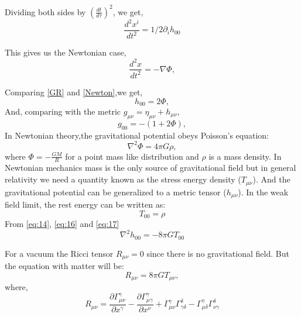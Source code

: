\documentclass{ttuthes2007}
\begin{document}
Dividing both sides by $\left(\frac{dt}{d\tau}\right)^2$, we get,
\begin{equation} \label{GR}                                                               
\frac{d^2x^i}{dt^2}=1/2 \partial _i h_{00}
\end{equation} 

This gives us the Newtonian case,
\begin{equation} \label{Newton}
\frac{d^2x}{dt^2}=-\nabla \Phi,
\end{equation}

Comparing \ref{GR} and \ref{Newton},we get,
\begin{equation} \label{eq:14}
h_{00}=2\Phi,
\end{equation}
And, comparing with the metric $g_{\mu \nu}= \eta_{\mu \nu} + h_{\mu \nu}$,
\begin{equation}\label{eq:15}
g_{00}=-(1+2\Phi),
\end{equation}
In Newtonian theory,the  gravitational potential obeys Poisson's
equation:
\begin{equation} \label{eq:16}
\nabla ^ 2\Phi = 4\pi G\rho,
\end{equation}
where $\Phi=-\frac{GM}{R}$ for a point mass like distribution and $\rho$ is a
mass density. In Newtonian mechanics mass is the only source of gravitational
field but in general relativity we need a quantity known as the stress energy
density ($T_{\mu\nu}$). And the gravitational potential can be generalized to a metric
tensor ($h_{\mu\nu}$).
In the weak field limit, the rest energy can be written as:
\begin{equation}\label{eq:17}
T_{00}=\rho
\end{equation}
From \ref{eq:14}, \ref{eq:16} and \ref{eq:17}
\begin{equation} \label{eq:18}
\nabla ^2h_{00}=-8\pi GT_{00}
\end{equation}
	
	For a vacuum the Ricci tensor $R_{\mu \nu} = 0$ since
there is no gravitational field. But the equation with matter will be:
\begin{equation} \label{eq:19}
R_{\mu \nu} = 8 \pi GT_{\mu \nu},
\end{equation}
where,
\begin{equation} \label{eq:22}
R_{\mu \nu} = \frac{\partial \Gamma ^\gamma _{\mu \nu}}{\partial x^\gamma} -
\frac{\partial \Gamma ^\gamma _{\mu \gamma}}{\partial x^\nu}+ \Gamma ^\gamma
_{\mu \nu}\Gamma ^\delta _{\gamma \delta}-\Gamma ^\gamma _{\mu \delta}\Gamma
^\delta_{\nu \gamma}
\end{equation}
\end{document}
